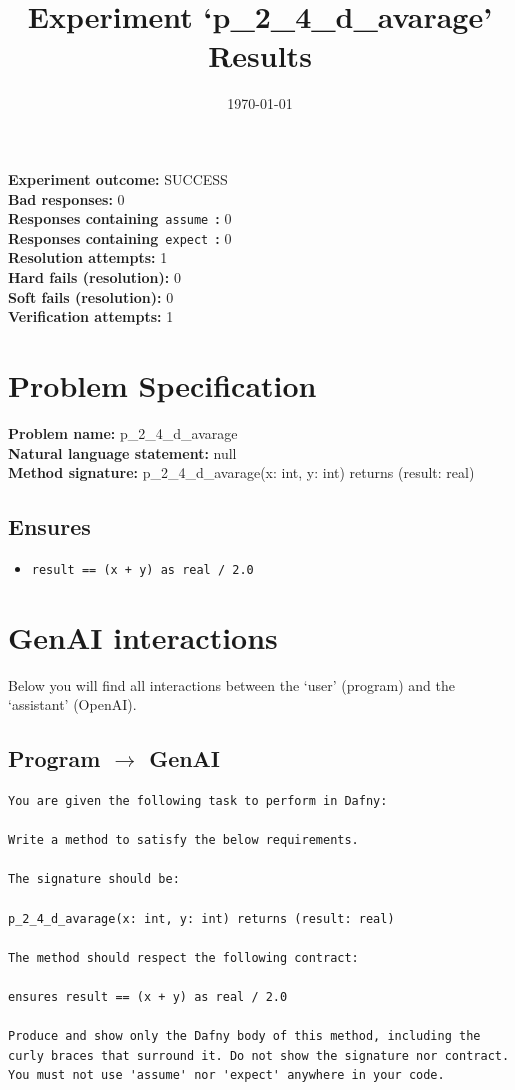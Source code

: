 \documentclass{article}
\begin{document}
\title{Experiment `p\_2\_4\_d\_avarage' Results}
\author{\today}
\date{}
\maketitle
\textbf{Experiment outcome: }SUCCESS
\\\textbf{Bad responses: }0
\\\textbf{Responses containing}~\texttt{assume}~\textbf{: }0
\\\textbf{Responses containing}~\texttt{expect}~\textbf{: }0
\\\textbf{Resolution attempts: }1
\\\textbf{Hard fails (resolution): }0
\\\textbf{Soft fails (resolution): }0
\\\textbf{Verification attempts: }1
\section*{Problem Specification}
\textbf{Problem name: }p\_2\_4\_d\_avarage
\\\textbf{Natural language statement: }null
\\\textbf{Method signature: }p\_2\_4\_d\_avarage(x: int, y: int) returns (result: real)
\subsection*{Ensures}
\begin{itemize}
\item \texttt{result == (x + y) as real / 2.0}
\end{itemize}
\clearpage
\section*{GenAI interactions}
Below you will find all interactions between the `user' (program) and the `assistant' (OpenAI).
\subsection*{Program $\rightarrow$ GenAI}
\begin{lstlisting}
You are given the following task to perform in Dafny:

Write a method to satisfy the below requirements.

The signature should be:

p_2_4_d_avarage(x: int, y: int) returns (result: real)

The method should respect the following contract:

ensures result == (x + y) as real / 2.0

Produce and show only the Dafny body of this method, including the curly braces that surround it. Do not show the signature nor contract. You must not use 'assume' nor 'expect' anywhere in your code.
\end{lstlisting}
\end{document}
